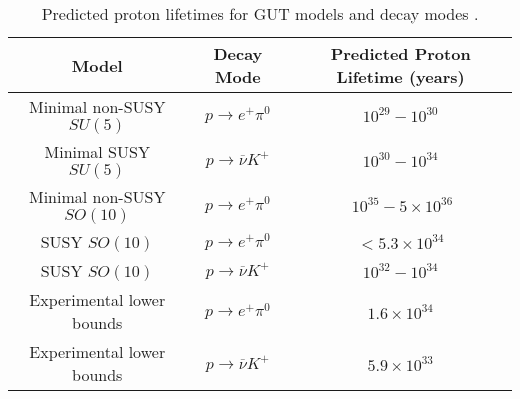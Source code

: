 \documentclass{article}
\begin{document}
\begin{table}[h!t]
\label{table:protonDecay}
\centering
\caption{Predicted proton lifetimes for GUT models and decay modes \cite{HyperK}.}
\begin{tabular}{ |c|c|c| } 
\hline	
Model & Decay Mode & Predicted Proton Lifetime (years)\\
\hline
Minimal non-SUSY $SU(5)$ & $p\rightarrow e^{+} \pi^{0}$ & $10^{29}-10^{30}$ \cite{PDMinimalSU5}\\ 
Minimal SUSY $SU(5)$ & $p\rightarrow \overline{\nu}K^+$ & $10^{30}-10^{34}$ \cite{PDMinimalSUSYSU5}\cite{SUSYSU5Decay}\\
Minimal non-SUSY $SO(10)$ & $p\rightarrow e^{+} \pi^{0}$ & $~10^{35}-5\times10^{36}$ \cite{SO10_1}\cite{SO10_2}\\ 
SUSY $SO(10)$ & $p\rightarrow e^{+} \pi^{0}$ & $<5.3\times 10^{34}$ \cite{SUSYSO10}\\
SUSY $SO(10)$ & $p\rightarrow \overline{\nu}K^+$ & $10^{32}-10^{34}$ \cite{PDSUSYSO10_1}\\
Experimental lower bounds & $p\rightarrow e^+ \pi^0$ & $1.6\times10^{34}$ \cite{SuperK2016} \\
Experimental lower bounds & $p\rightarrow \overline{\nu}K^+$ & $5.9\times10^{33}$\cite{SuperK2014} \\
 \hline
\end{tabular}
\end{table}
\end{document}
